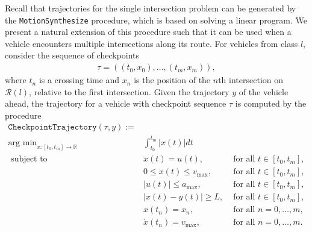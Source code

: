 \documentclass[a4paper]{article}
\theoremstyle{definition}
\theoremstyle{plain}
\begin{document}
Recall that trajectories for the single intersection problem can be generated by
the \texttt{MotionSynthesize} procedure, which is based on solving a linear
program.
%
%
We present a natural extension of this procedure such that it can be used when a
vehicle encounters multiple intersections along its route. For vehicles from
class $l$, consider the sequence of checkpoints
%
\begin{align*}
  \tau = ((t_{0}, x_{0}), \dots, (t_{m}, x_{m})) ,
\end{align*}
where $t_{n}$ is a crossing time and $x_{n}$ is the position of the $n$th
intersection on $\mathcal{R}(l)$, relative to the first intersection.
%
Given the trajectory $y$ of the vehicle ahead, the trajectory for a vehicle with
checkpoint sequence $\tau$ is computed by the procedure
%
\begin{align*}
  \texttt{CheckpointTrajectory}(\tau, y) := \\
  \text{arg min}_{x : [t_{0}, t_{m}] \rightarrow \mathbb{R}} \; &\int_{t_{0}}^{t_{m}} |x(t)|dt \\
  \text{ subject to } \; & \ddot{x}(t) = u(t) ,& \text{ for all } t \in [t_{0}, t_{m}] , \\
  & 0 \leq \dot{x}(t) \leq v_{\max} ,& \text{ for all } t \in [t_{0}, t_{m}] , \\
  & |u(t)| \leq a_{\max} ,& \text{ for all } t \in [t_{0}, t_{m}] , \\
  & |x(t) - y(t)| \geq L ,& \text{ for all } t \in [t_{0}, t_{m}] , \\
  & x(t_{n}) = x_{n} ,& \text{ for all } n = 0, \dots, m , \\
  & \dot{x}(t_{n}) = v_{\max} ,& \text{ for all } n = 0, \dots, m .
\end{align*}
\end{document}
